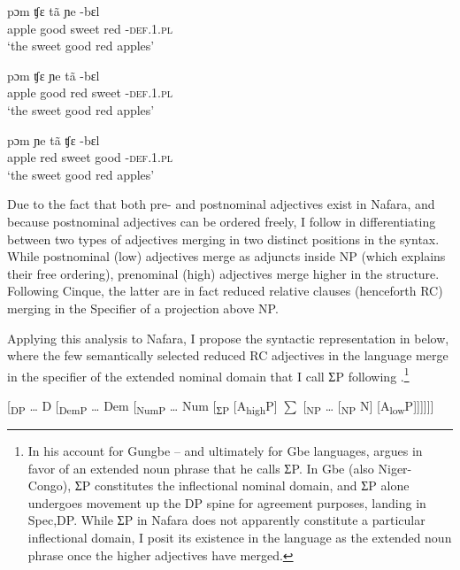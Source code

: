 \documentclass[output=paper]{langscibook}
\begin{document}
\ex
\gll   pɔm     ʧɛ   tã     ɲe    -bɛl   \\
apple    good  sweet     red    -\textsc{def.1.pl}\\
\glt ‘the sweet good red apples’



\ex
\gll   pɔm     ʧɛ   ɲe    tã     -bɛl    \\
apple    good  red    sweet     -\textsc{def.1.pl}\\
\glt ‘the sweet good red apples’



\ex
\gll   pɔm     ɲe  tã     ʧɛ     -bɛl     \\
apple    red  sweet     good    -\textsc{def.1.pl}\\
\glt ‘the sweet good red apples’
\z
\z

Due to the fact that both pre- and postnominal adjectives exist in Nafara, and because postnominal adjectives can be ordered freely, I follow \citet{Cinque2010} in differentiating between two types of adjectives merging in two distinct positions in the syntax. While postnominal (low) adjectives merge as adjuncts inside NP (which explains their free ordering), prenominal (high) adjectives merge higher in the structure. Following Cinque, the latter are in fact reduced relative clauses (henceforth RC) merging in the Specifier of a projection above NP.

Applying this analysis to Nafara, I propose the syntactic representation in  below, where the few semantically selected reduced RC adjectives in the language merge in the specifier of the extended nominal domain that I call ƩP following \citet{Aboh2004}.\footnote{In his account for Gungbe – and ultimately for Gbe languages, \citet{Aboh2004} argues in favor of an extended noun phrase that he calls ƩP. In Gbe (also Niger-Congo), ƩP constitutes the inflectional nominal domain, and ƩP alone undergoes movement up the DP spine for agreement purposes, landing in Spec,DP. While ƩP in Nafara does not apparently constitute a particular inflectional domain, I posit its existence in the language as the extended noun phrase once the higher adjectives have merged.}

\ea\label{ex:baron:13}
[\textsubscript{DP} … D [\textsubscript{DemP} … Dem [\textsubscript{NumP} … Num [\textsubscript{ƩP} [A\textsubscript{high}P] ${\sum}$ [\textsubscript{NP} … [\textsubscript{NP} N] [A\textsubscript{low}P]]]]]]
\z
\end{document}
